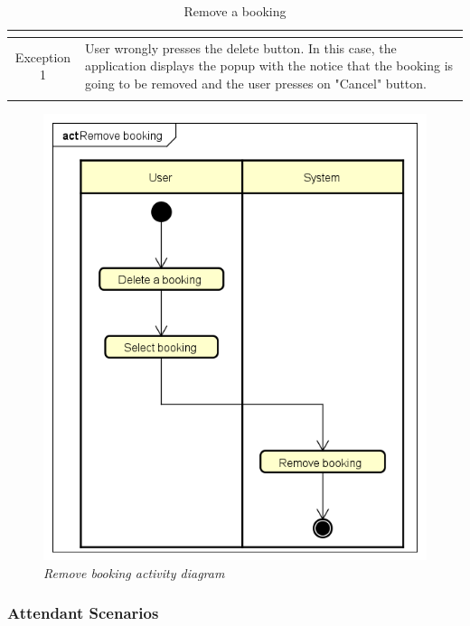 \documentclass[table, 12pt]{article}
\begin{document}
\begin{longtable}{|c| p{10cm}|}
\begin{itemize}
    \end{itemize}
    \\
    \hline
    \hline
    Exception 1      & User wrongly presses the delete button. In this case, the application displays the popup with the notice that the booking is going to be removed and the user presses on "Cancel" button. \\
    \hline
    \caption{Remove a booking}                                                                                                                                                                                   \\
\end{longtable}



\newpage
\begin{figure}[H]
    \centering
    \includegraphics[scale=0.5]{assets/Activity-Diagrams/act_remove.png}
    \caption{\textit{Remove booking activity diagram}}
\end{figure}



\subsubsection{Attendant Scenarios}
\end{document}

